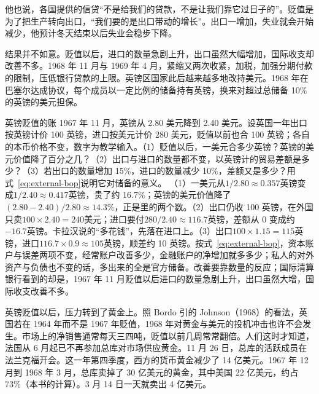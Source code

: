 他也说，各国提供的信贷“不是给我们的贷款，不是让我们靠它过日子的”\cite{hansard1967}。贬值是为了把生产转向出口，“我们要的是出口带动的增长”\cite{hansard1967}。出口一增加，失业就会开始减少，他预计冬天结束以后失业会稳步下降\cite{hansard1967}。

结果并不如意。贬值以后，进口的数量急剧上升，出口虽然大幅增加，国际收支却改善不多\cite{bis36}。1968 年 11 月与 1969 年 4 月，紧缩又两次收紧，加税，加强分期付款的限制，压低银行贷款的上限\cite{bis36}。英镑区国家此后越来越多地改持美元。1968 年在巴塞尔达成协议，每个成员以一定比例的储备持有英镑，换来对超过总储备 10\% 的英镑的美元担保\cite{bordo1993}。

\begin{example}{英镑贬值的账}\label{ex:brettonwoods-sterling}
1967 年 11 月，英镑从 2.80 美元降到 2.40 美元\cite{hansard1967}。设英国一年出口按英镑计价 100 英镑，进口按美元计价 280 美元，贬值以前也合 100 英镑；各自的本币价格不变，数字为教学输入。（1）贬值以后，一美元合多少英镑？英镑的美元价值降了百分之几？（2）出口与进口的数量都不变，以英镑计的贸易差额是多少？（3）若出口的数量增加 15\%，进口的数量减少 10\%，差额又是多少？用式~\eqref{eq:external-bop}说明它对储备的意义。
\solution
（1）一美元从$1/2.80\approx0.357$英镑变成$1/2.40\approx0.417$英镑，贵了约 16.7\%；英镑的美元价值降了$(2.80-2.40)/2.80\approx14.3\%$，正是里的两个数。（2）出口仍收 100 英镑，在外国只卖$100\times2.40=240$美元；进口要付$280/2.40\approx116.7$英镑，差额从 0 变成约$-16.7$英镑。卡拉汉说的“多花钱”，先落在进口上。（3）出口$100\times1.15=115$英镑，进口$116.7\times0.9\approx105$英镑，顺差约 10 英镑。按式~\eqref{eq:external-bop}，资本账户与误差两项不变，经常账户改善多少，金融账户的净增加就多多少；私人的对外资产与负债也不变的话，多出来的全是官方储备。改善要靠数量的反应；国际清算银行看到的却是，1967 年 11 月贬值以后进口的数量急剧上升，出口虽然大增，国际收支改善不多\cite{bis36}。
\end{example}

英镑贬值以后，压力转到了黄金上。照 Bordo 引的 Johnson（1968）的看法，英国若在 1964 年而不是 1967 年贬值，1968 年对黄金与美元的投机冲击也许不会发生\cite{bordo1993}。市场上的净销售通常每天三四吨，贬值以前几周常常翻倍\cite{bis36}。人们这时才知道，法国从 6 月起已不再参加总库对市场供应黄金\cite{bis36}。11 月 26 日，总库的活跃成员在法兰克福开会\cite{bis36}。这一年第四季度，西方的货币黄金减少了 14 亿美元\cite{bis36}。1967 年 12 月到 1968 年 3 月，总库卖掉了 30 亿美元的黄金，其中美国 22 亿美元\cite{bordo1993}，约占 73\%（本书的计算）。3 月 14 日一天就卖出 4 亿美元\cite{garber1993}。

